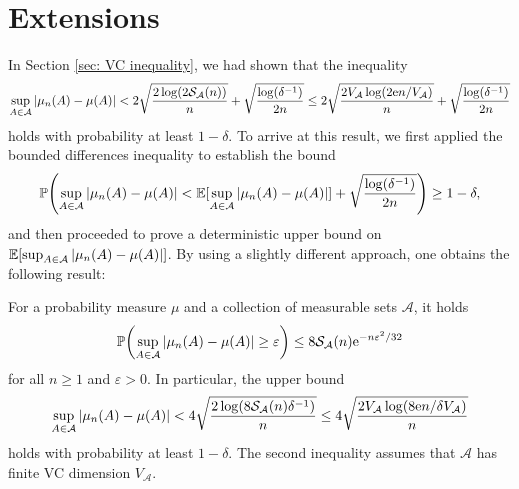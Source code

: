 \section{Extensions}

In Section \ref{sec: VC inequality}, we had shown that the inequality
\[
    \sup_{A \in \mathcal{A}} \abs{\mu_n(A) - \mu(A)} < 2 \sqrt{\frac{2 \log(2 \mathcal{S}_{\mathcal{A}}(n))}{n}} + \sqrt{\frac{\log(\delta^{-1})}{2n}} \leq 2 \sqrt{\frac{2 V_{\mathcal{A}} \log(2 \mathrm{e} n / V_{\mathcal{A}})}{n}} + \sqrt{\frac{\log(\delta^{-1})}{2n}}
\]
holds with probability at least $1 - \delta$. To arrive at this result, we first applied the bounded differences inequality to establish the bound
\[
    \Prob\left(\sup_{A \in \mathcal{A}} \abs{\mu_n(A) - \mu(A)} < \Exp[\sup_{A \in \mathcal{A}} \abs{\mu_n(A) - \mu(A)}] + \sqrt{\frac{\log(\delta^{-1})}{2n}}\right) \geq 1 - \delta,
\]
and then proceeded to prove a deterministic upper bound on $\operatorname{\mathbb{E}}[\sup_{A \in \mathcal{A}} \abs{\mu_n(A) - \mu(A)}]$. By using a slightly different approach, one obtains the following result:

\begin{theorem}
\label{thm: fast rate VC inequality}
For a probability measure $\mu$ and a collection of measurable sets $\mathcal{A}$, it holds
\[
    \Prob\left(\sup_{A \in \mathcal{A}} \abs{\mu_n(A) - \mu(A)} \geq \varepsilon\right) \leq 8 \mathcal{S}_{\mathcal{A}}(n) \e^{-n \varepsilon^2 / 32}
\]
for all $n \geq 1$ and $\varepsilon > 0$. In particular, the upper bound
\[
    \sup_{A \in \mathcal{A}} \abs{\mu_n(A) - \mu(A)} < 4 \sqrt{\frac{2 \log(8 \mathcal{S}_{\mathcal{A}}(n) \delta^{-1})}{n}} \leq 4 \sqrt{\frac{2 V_{\mathcal{A}} \log(8 \mathrm{e} n / \delta V_{\mathcal{A}})}{n}}
\]
holds with probability at least $1 - \delta$. The second inequality assumes that $\mathcal{A}$ has finite VC dimension $V_{\mathcal{A}}$.
\end{theorem}

